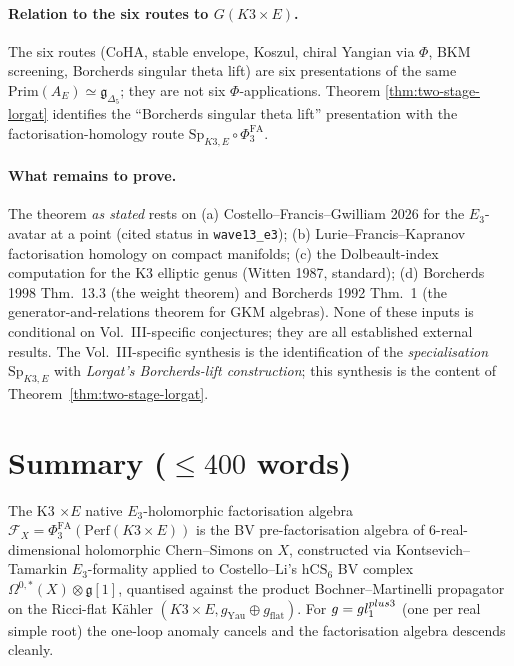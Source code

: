 \documentclass[11pt]{amsart}
\providecommand{\cF}{\mathcal{F}}
\providecommand{\hCS}{\mathrm{hCS}}
\providecommand{\Perf}{\mathrm{Perf}}
\providecommand{\frakg}{\mathfrak{g}}
\providecommand{\gDelta}{\mathfrak{g}_{\Delta_5}}
\providecommand{\Sp}{\mathrm{Sp}}
\providecommand{\Prim}{\mathrm{Prim}}
\theoremstyle{plain}
\theoremstyle{definition}
\theoremstyle{remark}
\begin{document}
\paragraph{Relation to the six routes to $G(K3\times E)$.} The six routes
(CoHA, stable envelope, Koszul, chiral Yangian via $\Phi$, BKM screening,
Borcherds singular theta lift) are six presentations of the same
$\Prim(A_E)\simeq\gDelta$; they are not six $\Phi$-applications. Theorem
\ref{thm:two-stage-lorgat} identifies the ``Borcherds singular theta
lift'' presentation with the factorisation-homology route
$\Sp_{K3,E}\circ\Phi^{\mathrm{FA}}_3$.

\paragraph{What remains to prove.} The theorem \emph{as stated} rests on
(a) Costello--Francis--Gwilliam 2026 for the $E_3$-avatar at a point
(cited status in \texttt{wave13\_e3}); (b) Lurie--Francis--Kapranov
factorisation homology on compact manifolds; (c) the Dolbeault-index
computation for the K3 elliptic genus (Witten 1987, standard); (d)
Borcherds 1998 Thm.~13.3 (the weight theorem) and Borcherds 1992 Thm.~1
(the generator-and-relations theorem for GKM algebras). None of these
inputs is conditional on Vol.~III-specific conjectures; they are all
established external results. The Vol.~III-specific synthesis is the
identification of the \emph{specialisation} $\Sp_{K3,E}$ with
\emph{Lorgat's Borcherds-lift construction}; this synthesis is the
content of Theorem~\ref{thm:two-stage-lorgat}.

\section*{Summary ($\le 400$ words)}

The K3 $\times E$ native $E_3$-holomorphic factorisation algebra
$\cF_X=\Phi^{\mathrm{FA}}_3(\Perf(K3\times E))$ is the BV
pre-factorisation algebra of $6$-real-dimensional holomorphic
Chern--Simons on $X$, constructed via Kontsevich--Tamarkin
$E_3$-formality applied to Costello--Li's $\hCS_6$ BV complex
$\Omega^{0,\ast}(X)\otimes\frakg[1]$, quantised against the product
Bochner--Martinelli propagator on the Ricci-flat K\"ahler $(K3\times E,
g_{\mathrm{Yau}}\oplus g_{\mathrm{flat}})$. For $\frakg=\fgl_1^{\oplus
3}$ (one per real simple root) the one-loop anomaly cancels and the
factorisation algebra descends cleanly.
\end{document}
